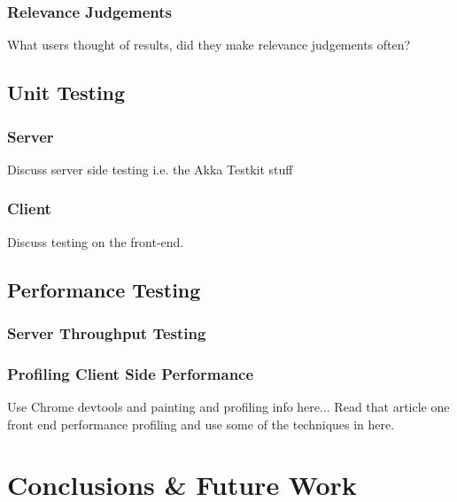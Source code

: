 \documentclass{l4proj}
\begin{document}
    \subsection{Relevance Judgements}
    What users thought of results, did they make relevance judgements often?

\section{Unit Testing}
    \subsection{Server}
    Discuss server side testing i.e. the Akka Testkit stuff
    
    \subsection{Client}
        Discuss testing on the front-end.

\section{Performance Testing}

    \subsection{Server Throughput Testing}

    \subsection{Profiling Client Side Performance}
    Use Chrome devtools and painting and profiling info here... Read that article one front end performance profiling and use some of the techniques in here.      
        
    
    



\chapter{Conclusions \& Future Work}


\end{document}
